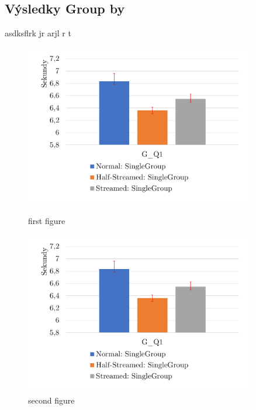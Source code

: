 \subsection{Výsledky Group by}

asdksflrk jr arjl r t

\begin{figure}
    \centering
    \begin{minipage}{0.45\textwidth}
        \centering
        \includegraphics[width=0.9\textwidth]{../img/aa.pdf} %
        \caption{first figure}
    \end{minipage}\hfill
    \begin{minipage}{0.45\textwidth}
        \centering
        \includegraphics[width=0.9\textwidth]{../img/aa.pdf} %
        \caption{second figure}
    \end{minipage}
\end{figure}